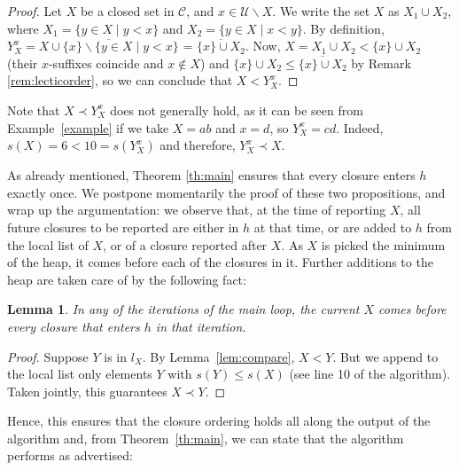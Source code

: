 \documentclass{article}
\newtheorem{lemma}{Lemma}
\newcommand{\added}[1]{\textcolor{blue}{#1}}
\newcommand{\st}[1]{%
  \sbox0{#1}%
  \usebox0%
  \llap{\rule[0.5ex]{\wd0}{0.4pt}}%
}
\def\U{\mathcal{U}}
\def\C{\mathcal{C}}
\def\s{\mathit{s}}
\newcommand{\cl}[1]{\overline{#1}}
\def\bef{\prec}
\begin{document}
\begin{proof} %
Let $X$ be a closed set in $\C$, and $x \in \U \backslash X$. We write the set $X$ as $X_1 \cup X_2$, where $X_1=\{y \in X \mid y<x\}$ and $X_2=\{y \in X \mid x<y\}$. By definition, $Y^x_X=\cl{X \cup \{x\} \backslash \{y \in X \mid y<x\}}$ = $\cl{\{x\} \cup X_2}$. Now, $X=X_1 \cup X_2 < \{x\} \cup X_2$ (their $x$-suffixes coincide and $x \notin X$) and $\{x\} \cup X_2 \leq \cl{\{x\} \cup X_2}$ by Remark \ref{rem:lecticorder}, so we can conclude that $X <  Y^x_X$.
\end{proof}


Note that $X\bef Y^x_X$ does not generally hold, as it can be seen from Example~\ref{example} if we take $X=ab$ and $x=d$, so $Y^x_X=cd$. Indeed, $\s(X)=6<10=\s(Y^x_X)$ and therefore, $Y^x_X \bef X$.


As already mentioned, Theorem \ref{th:main} ensures that every closure enters $h$ exactly once.
We postpone momentarily the proof of 
these two propositions, and wrap up the
argumentation: we observe that, at the time of reporting $X$, all 
future closures to be reported are either in $h$ at that time, or 
are added to $h$ from the local list of $X$, or of a closure 
reported after $X$. As $X$ is picked the minimum of the heap,
it comes before each of the closures in it. Further additions
to the heap are taken care of by the following fact:

\begin{lemma}\label{lem:1}
In any of the iterations of the main loop, the current $X$ comes before 
every closure that enters $h$ in that iteration.
\end{lemma}


\begin{proof} %
Suppose $Y$ is in $l_X$.
By Lemma~\ref{lem:compare}, $X < Y$.
But we append to the local list only 
elements $Y$ with $\s(Y) \leq \s(X)$ 
(see line 10 of the algorithm). Taken jointly,
this guarantees $X \bef Y$. 
\end{proof}

Hence, this 
ensures that the closure ordering holds all along the output 
of the algorithm and, from Theorem~\ref{th:main},
we can state that the algorithm performs as advertised:
\end{document}
